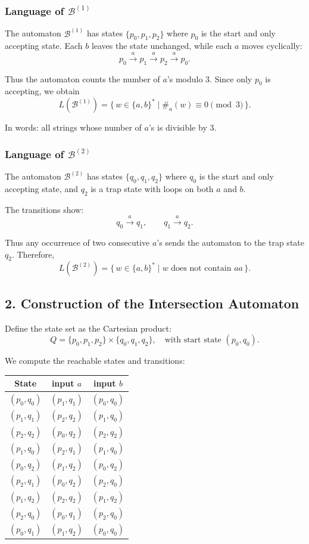 \documentclass{article}
\theoremstyle{theorem}
\theoremstyle{definition}
\theoremstyle{remark}
\begin{document}
\subsubsection*{Language of $\mathcal B^{(1)}$}

The automaton $\mathcal B^{(1)}$ has states 
$\{p_0,p_1,p_2\}$ where $p_0$ is the start and only accepting state.
Each $b$ leaves the state unchanged, while each $a$ moves cyclically:
\[
p_0 \xrightarrow{a} p_1 \xrightarrow{a} p_2 \xrightarrow{a} p_0.
\]

Thus the automaton counts the number of $a$'s modulo $3$. Since only
$p_0$ is accepting, we obtain
\[
L(\mathcal B^{(1)}) 
= 
\{\, w \in \{a,b\}^* \mid \#_a(w) \equiv 0 \pmod{3} \,\}.
\]

In words: all strings whose number of $a$'s is divisible by $3$.

\bigskip

\subsubsection*{Language of $\mathcal B^{(2)}$}

The automaton $\mathcal B^{(2)}$ has states 
$\{q_0,q_1,q_2\}$ where $q_0$ is the start and only accepting state,
and $q_2$ is a trap state with loops on both $a$ and $b$.

The transitions show:
\[
q_0 \xrightarrow{a} q_1, 
\qquad
q_1 \xrightarrow{a} q_2.
\]

Thus any occurrence of two consecutive $a$'s sends the automaton
to the trap state $q_2$. Therefore,
\[
L(\mathcal B^{(2)}) 
=
\{\, w \in \{a,b\}^* \mid w \text{ does not contain } aa \,\}.
\]

\bigskip

\subsection*{2. Construction of the Intersection Automaton}

Define the state set as the Cartesian product:
\[
Q = \{p_0, p_1, p_2\} \times \{q_0, q_1, q_2\}, \quad \text{with start state } (p_0, q_0).
\]

We compute the reachable states and transitions:

\begin{center}
\begin{tabular}{c|cc}
State & input $a$ & input $b$ \\ \hline
$(p_0,q_0)$ & $(p_1,q_1)$ & $(p_0,q_0)$ \\
$(p_1,q_1)$ & $(p_2,q_2)$ & $(p_1,q_0)$ \\
$(p_2,q_2)$ & $(p_0,q_2)$ & $(p_2,q_2)$ \\
$(p_1,q_0)$ & $(p_2,q_1)$ & $(p_1,q_0)$ \\
$(p_0,q_2)$ & $(p_1,q_2)$ & $(p_0,q_2)$ \\
$(p_2,q_1)$ & $(p_0,q_2)$ & $(p_2,q_0)$ \\
$(p_1,q_2)$ & $(p_2,q_2)$ & $(p_1,q_2)$ \\
$(p_2,q_0)$ & $(p_0,q_1)$ & $(p_2,q_0)$ \\
$(p_0,q_1)$ & $(p_1,q_2)$ & $(p_0,q_0)$
\end{tabular}
\end{center}
\end{document}
